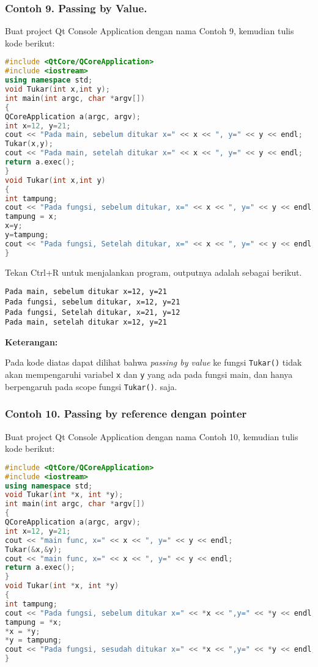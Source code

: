 \subsubsection*{Contoh 9. Passing by Value.}

Buat project Qt Console Application dengan nama Contoh 9, kemudian tulis
kode berikut:

\begin{lstlisting}[language=c++]
#include <QtCore/QCoreApplication>
#include <iostream>
using namespace std;
void Tukar(int x,int y);
int main(int argc, char *argv[])
{
QCoreApplication a(argc, argv);
int x=12, y=21;
cout << "Pada main, sebelum ditukar x=" << x << ", y=" << y << endl;
Tukar(x,y);
cout << "Pada main, setelah ditukar x=" << x << ", y=" << y << endl;
return a.exec();
}
void Tukar(int x,int y)
{
int tampung;
cout << "Pada fungsi, sebelum ditukar, x=" << x << ", y=" << y << endl;
tampung = x;
x=y;
y=tampung;
cout << "Pada fungsi, Setelah ditukar, x=" << x << ", y=" << y << endl;
}
\end{lstlisting}

Tekan Ctrl+R untuk menjalankan program, outputnya adalah sebagai
berikut.

\begin{verbatim}
Pada main, sebelum ditukar x=12, y=21
Pada fungsi, sebelum ditukar, x=12, y=21
Pada fungsi, Setelah ditukar, x=21, y=12
Pada main, setelah ditukar x=12, y=21
\end{verbatim}

\textbf{Keterangan:}

Pada kode diatas dapat dilihat bahwa \emph{passing by value} ke fungsi
\texttt{Tukar()} tidak akan mempengaruhi variabel \texttt{x} dan
\texttt{y} yang ada pada fungsi main, dan hanya berpengaruh pada scope
fungsi \texttt{Tukar()}. saja.

\subsubsection*{Contoh 10. Passing by reference dengan pointer}

Buat project Qt Console Application dengan nama Contoh 10, kemudian
tulis kode berikut:

\begin{lstlisting}[language=c++]
#include <QtCore/QCoreApplication>
#include <iostream>
using namespace std;
void Tukar(int *x, int *y);
int main(int argc, char *argv[])
{
QCoreApplication a(argc, argv);
int x=12, y=21;
cout << "main func, x=" << x << ", y=" << y << endl;
Tukar(&x,&y);
cout << "main func, x=" << x << ", y=" << y << endl;
return a.exec();
}
void Tukar(int *x, int *y)
{
int tampung;
cout << "Pada fungsi, sebelum ditukar x=" << *x << ",y=" << *y << endl;
tampung = *x;
*x = *y;
*y = tampung;
cout << "Pada fungsi, sesudah ditukar x=" << *x << ",y=" << *y << endl;
}
\end{lstlisting}

